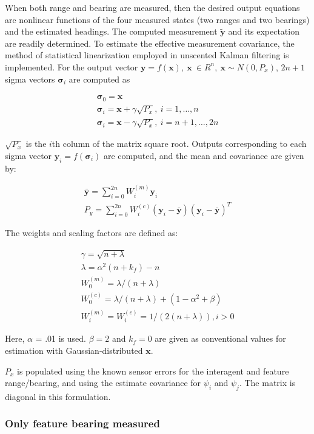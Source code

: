 \documentclass{aiaa-tc}
\newcommand{\B}[1]{\textbf{#1}} %
\newcommand{\BG}[1]{{\bm #1}}           %
\begin{document}
When both range and bearing are measured, then the desired output equations are nonlinear functions of the four measured states (two ranges and two bearings) and the estimated headings. The computed measurement $\tilde{\B{y}}$ and its expectation are readily determined. To estimate the effective measurement covariance, the method of statistical linearization employed in unscented Kalman filtering is implemented. For the output vector $\B{y} = f(\B{x}), \ \B{x} \ \in \mathit{R}^n, \ \B{x} \sim N(0,P_x)$, $2n+1$ sigma vectors $\BG{\sigma}_i$ are computed as

\begin{align}
\BG{\sigma}_0 = \B{x} \\
\BG{\sigma}_i = \B{x} + \gamma \sqrt{P_x}, \ i = 1,\dots,n \\
\BG{\sigma}_i = \B{x} - \gamma \sqrt{P_x},\ i = n+1,\dots,2n
\end{align}

$\sqrt{P_x}$ is the $i$th column of the matrix square root. Outputs corresponding to each sigma vector $\B{y}_i = f(\BG{\sigma}_i)$ are computed, and the mean and covariance are given by:

\begin{align}
\bar{\B{y}} = \sum_{i=0}^{2n} W_i^{(m)} \B{y}_i \\
P_y = \sum_{i=0}^{2n} W_i^{(c)} (\B{y}_i-\bar{\B{y}})(\B{y}_i-\bar{\B{y}})^T
\end{align}

The weights and scaling factors are defined as:

\begin{align}
\gamma = \sqrt{n+\lambda} \\
\lambda = \alpha^2 (n+k_f)-n \\
W_0^{(m)} = \lambda/(n+\lambda) \\
W_0^{(c)} = \lambda/(n+\lambda) + (1-\alpha^2 + \beta)  \\
W_i^{(m)} = W_i^{(c)} = 1/(2(n+\lambda)), i > 0
\end{align}

Here, $\alpha$ = .01 is used. $\beta = 2$ and $k_f=0$ are given as conventional values for estimation with Gaussian-distributed $\B{x}$.\cite{gyorgy2014}

$P_x$ is populated using the known sensor errors for the interagent and feature range/bearing, and using the estimate covariance for $\psi_i$ and $\psi_j$. The matrix is diagonal in this formulation.

\subsubsection{Only feature bearing measured}
\end{document}
